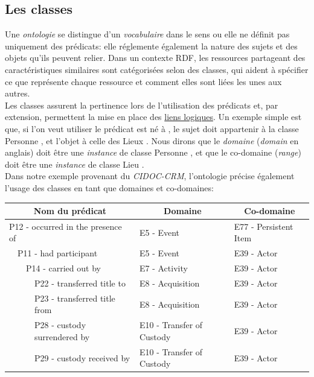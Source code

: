 \documentclass[a4paper,12pt,twoside]{book}
\begin{document}
\subsection{Les classes}\label{1-classes}

Une \textit{ontologie} se distingue d'un \textit{vocabulaire} dans le sens ou elle ne définit pas uniquement des prédicats: elle réglemente également la nature des sujets et des objets qu'ils peuvent relier. Dans un contexte RDF, les ressources partageant des caractéristiques similaires sont catégorisées selon des classes, qui aident à spécifier ce que représente chaque ressource et comment elles sont liées les unes aux autres.\\

Les classes assurent la pertinence lors de l'utilisation des prédicats et, par extension, permettent la mise en place des \hyperref[liens-logiques]{liens logiques}. Un exemple simple est que, si l'on veut utiliser le prédicat \og est né à \fg, le sujet doit appartenir à la classe \og Personne \fg, et l'objet à celle des \og Lieux \fg. Nous dirons que le \textit{domaine} (\textit{domain} en anglais) doit être une \textit{instance} de classe \og Personne \fg, et que le co-domaine (\textit{range}) doit être une \textit{instance} de classe \og Lieu \fg.\\

Dans notre exemple provenant du \textit{CIDOC-CRM}, l'ontologie précise également l'usage des classes en tant que domaines et co-domaines:
\begin{center}    
\begin{tabular}{|cccc|c|c|}
\hline
\multicolumn{4}{|c|}{Nom du prédicat} & Domaine & Co-domaine\\
\hline
\multicolumn{4}{|l|}{P12 - occurred in the presence of} & \multicolumn{1}{l|}{E5 - Event} & \multicolumn{1}{l|}{E77 - Persistent Item}\\
\hline
 & \multicolumn{3}{l|}{P11 - had participant} & \multicolumn{1}{l|}{E5 - Event} & \multicolumn{1}{l|}{E39 - Actor}\\
\hline
 & & \multicolumn{2}{l|}{P14 - carried out by} & \multicolumn{1}{l|}{E7 - Activity} & \multicolumn{1}{l|}{E39 - Actor}\\
\hline
 & & & \multicolumn{1}{l|}{P22 - transferred title to} & \multicolumn{1}{l|}{E8 - Acquisition} & \multicolumn{1}{l|}{E39 - Actor}\\
\hline
 & & & \multicolumn{1}{l|}{P23 - transferred title from} & \multicolumn{1}{l|}{E8 - Acquisition} & \multicolumn{1}{l|}{E39 - Actor}\\
\hline
 & & & \multicolumn{1}{l|}{P28 - custody surrendered by} & \multicolumn{1}{l|}{E10 - Transfer of Custody} & \multicolumn{1}{l|}{E39 - Actor}\\
\hline
 & & & \multicolumn{1}{l|}{P29 - custody received by} & \multicolumn{1}{l|}{E10 - Transfer of Custody} & \multicolumn{1}{l|}{E39 - Actor}\\
\hline
\end{tabular}
\end{center}
\end{document}
